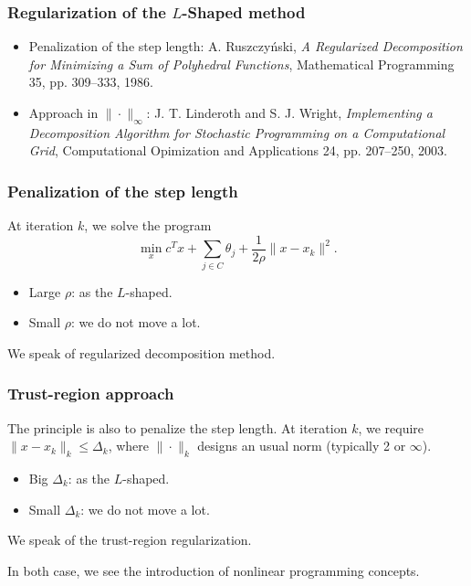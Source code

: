 \documentclass{beamer}
\begin{document}
\begin{frame}
\frametitle{Regularization of the $L$-Shaped method}

\vspace*{-3mm}

\begin{itemize}
\item
{\blue Penalization of the step length}: A. Ruszczy\'nski, {\sl A
Regularized Decomposition for Minimizing a Sum of Polyhedral
Functions}, Mathematical Programming 35, pp. 309--333, 1986.
\item
{\blue Approach in $\|\cdot\|_\infty$}: J. T. Linderoth and S. J. Wright, {\sl
Implementing a Decomposition Algorithm for Stochastic Programming on a
Computational Grid}, Computational Opimization and Applications 24,
pp. 207--250, 2003.
\end{itemize}

\end{frame}

\begin{frame}
\frametitle{Penalization of the step length}

At iteration $k$, we solve the program
\[
\min_x c^Tx + \sum_{j \in C} \theta_j + \frac{1}{2\rho} \| x-x_k \|^2.
\]
\begin{itemize}
\item
Large $\rho$: as the $L$-shaped.
\item
Small $\rho$: we do not move a lot.
\end{itemize}
We speak of {\blue regularized decomposition method}.

\end{frame}

\begin{frame}
\frametitle{Trust-region approach}

The principle is also to penalize the step length.
At iteration $k$, we require $\| x-x_k \|_k \leq \Delta_k$, where $\| \cdot \|_k$ designs an usual norm (typically 2 or $\infty$).

\begin{itemize}
\item
Big $\Delta_k$: as the $L$-shaped.
\item
Small $\Delta_k$: we do not move a lot.
\end{itemize}

We speak of the {\blue trust-region regularization}.

\mbox{}

In both case, we see the introduction of {\blue nonlinear programming} concepts.

\end{frame}
\end{document}
